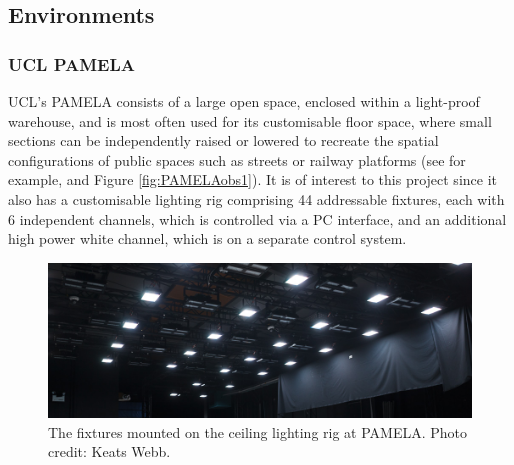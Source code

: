 
\subsection{Environments}

\subsubsection{UCL PAMELA} \label{sec:PAMELA}

\gls{UCL}'s \acrfull{PAMELA} consists of a large open space, enclosed within a light-proof warehouse, and is most often used for its customisable floor space, where small sections can be independently raised or lowered to recreate the spatial configurations of public spaces such as streets or railway platforms (see \citet{cheng_effect_2018} for example, and Figure \ref{fig:PAMELAobs1}). It is of interest to this project since it also has a customisable lighting rig comprising 44 addressable fixtures, each with 6 independent channels, which is controlled via a PC interface, and an additional high power white channel, which is on a separate control system. 

\begin{figure}[hbtp]
\includegraphics[max width=\textwidth]{figs/tablet/PAMELAlights1.jpg}
\caption{The fixtures mounted on the ceiling lighting rig at \acrshort{PAMELA}. Photo credit: Keats Webb.}
\label{fig:PAMELAlights1}
\end{figure}

